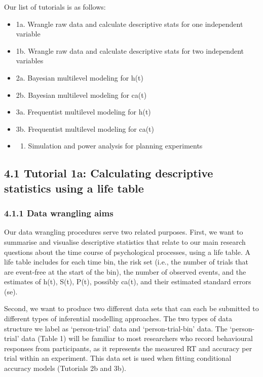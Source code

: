 \documentclass[
  man, donotrepeattitle,floatsintext]{apa6}
\providecommand{\tightlist}{%
  \setlength{\itemsep}{0pt}\setlength{\parskip}{0pt}}
\begin{document}
Our list of tutorials is as follows:

\begin{itemize}
\tightlist
\item
  1a. Wrangle raw data and calculate descriptive stats for one independent variable
\item
  1b. Wrangle raw data and calculate descriptive stats for two independent variables
\item
  2a. Bayesian multilevel modeling for h(t)
\item
  2b. Bayesian multilevel modeling for ca(t)
\item
  3a. Frequentist multilevel modeling for h(t)
\item
  3b. Frequentist multilevel modeling for ca(t)
\item
  \begin{enumerate}
  \def\labelenumi{\arabic{enumi}.}
  \setcounter{enumi}{3}
  \tightlist
  \item
    Simulation and power analysis for planning experiments
  \end{enumerate}
\end{itemize}

\subsection{4.1 Tutorial 1a: Calculating descriptive statistics using a life table}\label{tutorial-1a-calculating-descriptive-statistics-using-a-life-table}

\subsubsection{4.1.1 Data wrangling aims}\label{data-wrangling-aims}

Our data wrangling procedures serve two related purposes. First, we want to summarise and visualise descriptive statistics that relate to our main research questions about the time course of psychological processes, using a life table. A life table includes for each time bin, the risk set (i.e., the number of trials that are event-free at the start of the bin), the number of observed events, and the estimates of h(t), S(t), P(t), possibly ca(t), and their estimated standard errors (se).

Second, we want to produce two different data sets that can each be submitted to different types of inferential modelling approaches. The two types of data structure we label as `person-trial' data and `person-trial-bin' data. The `person-trial' data (Table 1) will be familiar to most researchers who record behavioural responses from participants, as it represents the measured RT and accuracy per trial within an experiment. This data set is used when fitting conditional accuracy models (Tutorials 2b and 3b).
\end{document}
